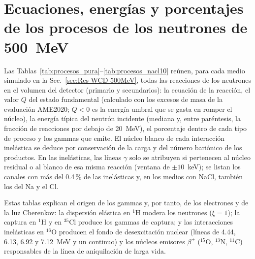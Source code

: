 \section{Ecuaciones, energías y porcentajes de los procesos de los neutrones de 500~MeV}
\label{ap:procesos-neutrones}

Las Tablas~\ref{tab:procesos_pura}--\ref{tab:procesos_nacl10} reúnen, para cada medio simulado en la Sec.~\ref{sec:Res-WCD-500MeV}, todas las reacciones de los neutrones en el volumen del detector (primario y secundarios): la ecuación de la reacción, el valor $Q$ del estado fundamental (calculado con los excesos de masa de la evaluación AME2020; $Q<0$ es la energía umbral que se gasta en romper el núcleo), la energía típica del neutrón incidente (mediana y, entre paréntesis, la fracción de reacciones por debajo de 20~MeV), el porcentaje dentro de cada tipo de proceso y los gammas que emite. El núcleo blanco de cada interacción inelástica se deduce por conservación de la carga y del número bariónico de los productos. En las inelásticas, las líneas $\gamma$ solo se atribuyen si pertenecen al núcleo residual o al blanco de esa misma reacción (ventana de $\pm10$~keV); se listan los canales con más del 0.4\,\% de las inelásticas y, en los medios con NaCl, también los del Na y el Cl.

Estas tablas explican el origen de los gammas y, por tanto, de los electrones y de la luz Cherenkov: la dispersión elástica en $^{1}$H modera los neutrones ($\xi=1$); la captura en $^{1}$H y en $^{35}$Cl produce los gammas de captura; y las interacciones inelásticas en $^{16}$O producen el fondo de desexcitación nuclear (líneas de 4.44, 6.13, 6.92 y 7.12~MeV y un continuo) y los núcleos emisores $\beta^{+}$ ($^{15}$O, $^{13}$N, $^{11}$C) responsables de la línea de aniquilación de larga vida.

